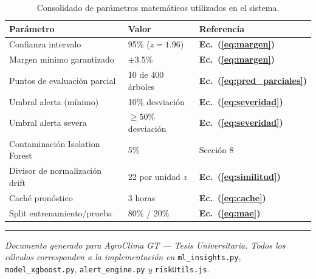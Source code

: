 \documentclass[12pt, a4paper]{article}
\newcommand{\eq}[1]{\textbf{Ec.~(#1)}}
\begin{document}
\begin{table}[h!]
\centering
\begin{tabular}{lll}
\toprule
\textbf{Parámetro} & \textbf{Valor} & \textbf{Referencia} \\
\midrule
Confianza intervalo          & 95\% ($z = 1.96$)     & \eq{\ref{eq:margen}} \\
Margen mínimo garantizado    & $\pm 3.5\%$           & \eq{\ref{eq:margen}} \\
Puntos de evaluación parcial & 10 de 400 árboles     & \eq{\ref{eq:pred_parciales}} \\
Umbral alerta (mínimo)       & 10\% desviación       & \eq{\ref{eq:severidad}} \\
Umbral alerta severa         & $\geq 50\%$ desviación & \eq{\ref{eq:severidad}} \\
Contaminación Isolation Forest & 5\%                 & Sección 8 \\
Divisor de normalización drift & 22 por unidad $z$   & \eq{\ref{eq:similitud}} \\
Caché pronóstico             & 3 horas               & \eq{\ref{eq:cache}} \\
Split entrenamiento/prueba   & 80\% / 20\%           & \eq{\ref{eq:mae}} \\
\bottomrule
\end{tabular}
\caption{Consolidado de parámetros matemáticos utilizados en el sistema.}
\end{table}

\vspace{2em}
\hrule
\vspace{0.5em}
{\small \textit{Documento generado para AgroClima GT — Tesis Universitaria. Todos los cálculos corresponden a la implementación en} \texttt{ml\_insights.py}, \texttt{model\_xgboost.py}, \texttt{alert\_engine.py} \textit{y} \texttt{riskUtils.js}.}
\end{document}

